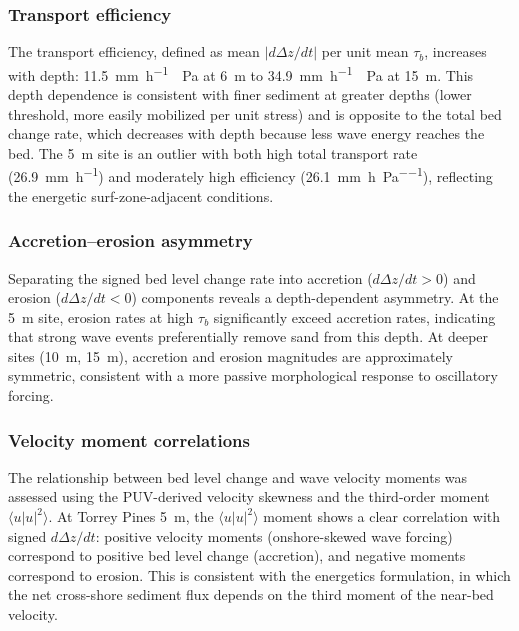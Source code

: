 \subsubsection{Transport efficiency}

The transport efficiency, defined as mean $|d\Delta z/dt|$ per unit
mean $\tau_b$, increases with depth: \SI{11.5}{\milli\meter\per\hour
\per\pascal} at \SI{6}{\meter} to \SI{34.9}{\milli\meter\per\hour
\per\pascal} at \SI{15}{\meter}. This depth dependence is consistent
with finer sediment at greater depths (lower threshold, more easily
mobilized per unit stress) and is opposite to the total bed change
rate, which decreases with depth because less wave energy reaches the
bed. The \SI{5}{\meter} site is an outlier with both high total
transport rate (\SI{26.9}{\milli\meter\per\hour}) and moderately high
efficiency (\SI{26.1}{\milli\meter\per\hour\per\pascal}), reflecting
the energetic surf-zone-adjacent conditions.

\subsubsection{Accretion--erosion asymmetry}

Separating the signed bed level change rate into accretion
($d\Delta z/dt > 0$) and erosion ($d\Delta z/dt < 0$) components
reveals a depth-dependent asymmetry. At the \SI{5}{\meter} site,
erosion rates at high $\tau_b$ significantly exceed accretion rates,
indicating that strong wave events preferentially remove sand from
this depth. At deeper sites (\SI{10}{\meter}, \SI{15}{\meter}),
accretion and erosion magnitudes are approximately symmetric,
consistent with a more passive morphological response to oscillatory
forcing.

\subsubsection{Velocity moment correlations}

The relationship between bed level change and wave velocity moments
\citep{hoefel2003} was assessed using the PUV-derived velocity
skewness and the third-order moment $\langle u|u|^2 \rangle$. At
Torrey Pines \SI{5}{\meter}, the $\langle u|u|^2 \rangle$ moment
shows a clear correlation with signed $d\Delta z/dt$: positive
velocity moments (onshore-skewed wave forcing) correspond to positive
bed level change (accretion), and negative moments correspond to
erosion. This is consistent with the \citet{hoefel2003} energetics
formulation, in which the net cross-shore sediment flux depends on
the third moment of the near-bed velocity.

